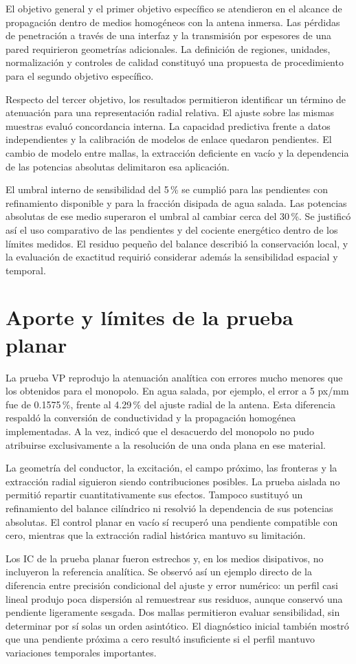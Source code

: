 El objetivo general y el primer objetivo específico se atendieron en el alcance de propagación dentro de medios homogéneos con la antena inmersa. Las pérdidas de penetración a través de una interfaz y la transmisión por espesores de una pared requirieron geometrías adicionales. La definición de regiones, unidades, normalización y controles de calidad constituyó una propuesta de procedimiento para el segundo objetivo específico.

Respecto del tercer objetivo, los resultados permitieron identificar un término de atenuación para una representación radial relativa. El ajuste sobre las mismas muestras evaluó concordancia interna. La capacidad predictiva frente a datos independientes y la calibración de modelos de enlace quedaron pendientes. El cambio de modelo entre mallas, la extracción deficiente en vacío y la dependencia de las potencias absolutas delimitaron esa aplicación.

El umbral interno de sensibilidad del 5\,\% se cumplió para las pendientes con refinamiento disponible y para la fracción disipada de agua salada. Las potencias absolutas de ese medio superaron el umbral al cambiar cerca del 30\,\%. Se justificó así el uso comparativo de las pendientes y del cociente energético dentro de los límites medidos. El residuo pequeño del balance describió la conservación local, y la evaluación de exactitud requirió considerar además la sensibilidad espacial y temporal.


\section{Aporte y límites de la prueba planar}
La prueba VP reprodujo la atenuación analítica con errores mucho menores que los obtenidos para el monopolo. En agua salada, por ejemplo, el error a 5 px/mm fue de 0.1575\,\%, frente al 4.29\,\% del ajuste radial de la antena. Esta diferencia respaldó la conversión de conductividad y la propagación homogénea implementadas. A la vez, indicó que el desacuerdo del monopolo no pudo atribuirse exclusivamente a la resolución de una onda plana en ese material.

La geometría del conductor, la excitación, el campo próximo, las fronteras y la extracción radial siguieron siendo contribuciones posibles. La prueba aislada no permitió repartir cuantitativamente sus efectos. Tampoco sustituyó un refinamiento del balance cilíndrico ni resolvió la dependencia de sus potencias absolutas. El control planar en vacío sí recuperó una pendiente compatible con cero, mientras que la extracción radial histórica mantuvo su limitación.

Los IC de la prueba planar fueron estrechos y, en los medios disipativos, no incluyeron la referencia analítica. Se observó así un ejemplo directo de la diferencia entre precisión condicional del ajuste y error numérico: un perfil casi lineal produjo poca dispersión al remuestrear sus residuos, aunque conservó una pendiente ligeramente sesgada. Dos mallas permitieron evaluar sensibilidad, sin determinar por sí solas un orden asintótico. El diagnóstico inicial también mostró que una pendiente próxima a cero resultó insuficiente si el perfil mantuvo variaciones temporales importantes.
